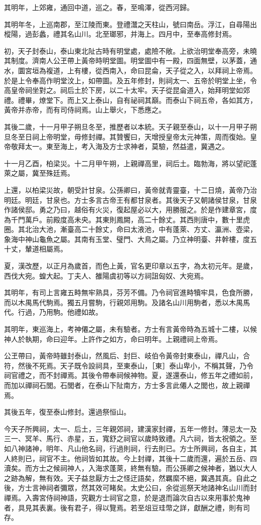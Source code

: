 其明年，上郊雍，通回中道，巡之。春，至鳴澤，從西河歸。

其明年冬，上巡南郡，至江陵而東。登禮灊之天柱山，號曰南岳。浮江，自尋陽出樅陽，過彭蠡，禮其名山川。北至瑯邪，并海上。四月中，至奉高修封焉。

初，天子封泰山，泰山東北阯古時有明堂處，處險不敞。上欲治明堂奉高旁，未曉其制度。濟南人公玊帶上黃帝時明堂圖。明堂圖中有一殿，四面無壁，以茅蓋，通水，圜宮垣為複道，上有樓，從西南入，命曰昆侖，天子從之入，以拜祠上帝焉。於是上令奉高作明堂汶上，如帶圖。及五年修封，則祠太一、五帝於明堂上坐，令高皇帝祠坐對之。祠后土於下房，以二十太牢。天子從昆侖道入，始拜明堂如郊禮。禮畢，燎堂下。而上又上泰山，自有祕祠其巔。而泰山下祠五帝，各如其方，黃帝并赤帝，而有司侍祠焉。山上舉火，下悉應之。

其後二歲，十一月甲子朔旦冬至，推歷者以本統。天子親至泰山，以十一月甲子朔旦冬至日祠上帝明堂，毋修封禪。其贊饗曰，天增授皇帝太元神策，周而復始。皇帝敬拜太一。東至海上，考入海及方士求神者，莫驗，然益遣，冀遇之。

十一月乙酉，柏梁災。十二月甲午朔，上親禪高里，祠后土。臨勃海，將以望祀蓬萊之屬，冀至殊廷焉。

上還，以柏梁災故，朝受計甘泉。公孫卿曰，黃帝就青靈臺，十二日燒，黃帝乃治明廷。明廷，甘泉也。方士多言古帝王有都甘泉者。其後天子又朝諸侯甘泉，甘泉作諸侯邸。勇之乃曰，越俗有火災，復起屋必以大，用勝服之。於是作建章宮，度為千門萬戶。前殿度高未央。其東則鳳闕，高二十餘丈。其西則唐中，數十里虎圈。其北治大池，漸臺高二十餘丈，命曰太液池，中有蓬萊、方丈、瀛洲、壺梁，象海中神山龜魚之屬。其南有玉堂、璧門、大鳥之屬。乃立神明臺、井幹樓，度五十丈，輦道相屬焉。

夏，漢改歷，以正月為歲首，而色上黃，官名更印章以五字，為太初元年。是歲，西伐大宛。蝗大起。丁夫人、雒陽虞初等以方祠詛匈奴、大宛焉。

其明年，有司上言雍五畤無牢熟具，芬芳不備。乃令祠官進畤犢牢具，色食所勝，而以木禺馬代駒焉。獨五月嘗駒，行親郊用駒。及諸名山川用駒者，悉以木禺馬代。行過，乃用駒。他禮如故。

其明年，東巡海上，考神僊之屬，未有驗者。方士有言黃帝時為五城十二樓，以候神人於執期，命曰迎年。上許作之如方，命曰明年。上親禮祠上帝焉。

公玊帶曰，黃帝時雖封泰山，然風后、封巨、岐伯令黃帝封東泰山，禪凡山，合符，然後不死焉。天子既令設祠具，至東泰山，［東］泰山卑小，不稱其聲，乃令祠官禮之，而不封禪焉。其後令帶奉祠候神物。夏，遂還泰山，修五年之禮如前，而加以禪祠石閭。石閭者，在泰山下阯南方，方士多言此僊人之閭也，故上親禪焉。

其後五年，復至泰山修封。還過祭恒山。

今天子所興祠，太一、后土，三年親郊祠，建漢家封禪，五年一修封。薄忌太一及三一、冥羊、馬行、赤星，五，寬舒之祠官以歲時致禮。凡六祠，皆太祝領之。至如八神諸神，明年、凡山他名祠，行過則祠，行去則已。方士所興祠，各自主，其人終則已，祠官不主。他祠皆如其故。今上封禪，其後十二歲而還，遍於五岳、四瀆矣。而方士之候祠神人，入海求蓬萊，終無有驗。而公孫卿之候神者，猶以大人之跡為解，無有效。天子益怠厭方士之怪迂語矣，然羈縻不絕，冀遇其真。自此之後，方士言神祠者彌眾，然其效可睹矣。太史公曰，余從巡祭天地諸神名山川而封禪焉。入壽宮侍祠神語，究觀方士祠官之意，於是退而論次自古以來用事於鬼神者，具見其表裏。後有君子，得以覽焉。若至俎豆珪幣之詳，獻酬之禮，則有司存。